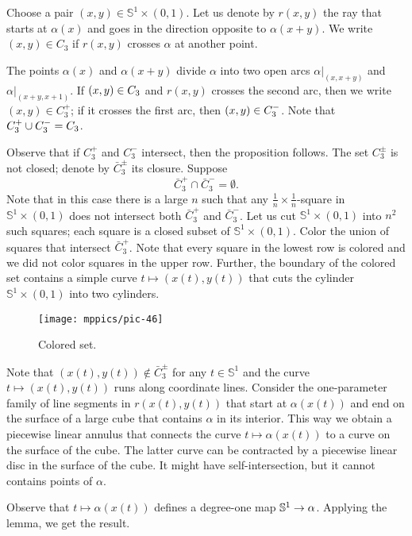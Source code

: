Choose a pair $(x,y)\in \mathbb{S}^1\times (0,1)$.
Let us denote by $r(x,y)$ the ray that starts at $\alpha(x)$ and goes in the direction opposite to $\alpha(x+y)$.
We write $(x,y)\in C_3$ if $r(x,y)$ crosses $\alpha$ at another point.

The points $\alpha(x)$ and $\alpha(x+y)$ divide $\alpha$ into two open arcs $\alpha|_{(x,x+y)}$ and $\alpha|_{(x+y,x+1)}$.
If $(x,y)\z\in C_3$ and $r(x,y)$ crosses the second arc, then we write $(x,y)\in C_3^+$;
if it crosses the first arc, then $(x,y)\z\in C_3^-$.
Note that $C_3^+\cup C_3^-\z=C_3$.

Observe that if $C_3^+$ and $C_3^-$ intersect, then the proposition follows.
The set $C_3^\pm$ is not closed;
denote by $\bar C_3^\pm$ its closure.
Suppose 
\[\bar C_3^+\cap \bar C_3^-=\emptyset.\]
Note that in this case there is a large $n$ such that any $\tfrac1n\times\tfrac1n$-square in $\mathbb{S}^1\times (0,1)$ does not intersect both $\bar C_3^+$ and $\bar C_3^-$.
Let us cut $\mathbb{S}^1\times (0,1)$ into $n^2$ such squares; each square is a closed subset of $\mathbb{S}^1\times (0,1)$.
Color the union of squares that intersect $\bar C_3^+$.
Note that every square in the lowest row is colored and we did not color squares in the upper row.
Further, the boundary of the colored set contains a simple curve $t\mapsto(x(t),y(t))$ that cuts  the cylinder $\mathbb{S}^1\times (0,1)$ into two cylinders.

\begin{wrapfigure}{r}{24 mm}
\vskip-0mm
\centering
\texttt{[image: mppics/pic-46]}
\caption*{Colored set.}
\vskip0mm
\end{wrapfigure}

Note that $(x(t),y(t))\notin \bar C_3^\pm$ for any $t\in \mathbb{S}^1$ and the curve $t\mapsto(x(t),y(t))$ runs along coordinate lines.
Consider the one-parameter family of line segments in $r(x(t),y(t))$ that start at $\alpha(x(t))$ and end on the surface of a large cube that contains $\alpha$ in its interior.
This way we obtain a piecewise linear annulus that connects the curve $t\mapsto \alpha(x(t))$ to a curve on the surface of the cube.
The latter curve can be contracted by a piecewise linear disc in the surface of the cube.
It might have self-intersection, but it cannot contains points of $\alpha$.

Observe that $t\mapsto \alpha(x(t))$ defines a degree-one map $\mathbb{S}^1\z\to\alpha$.
Applying the lemma, we get the result.

